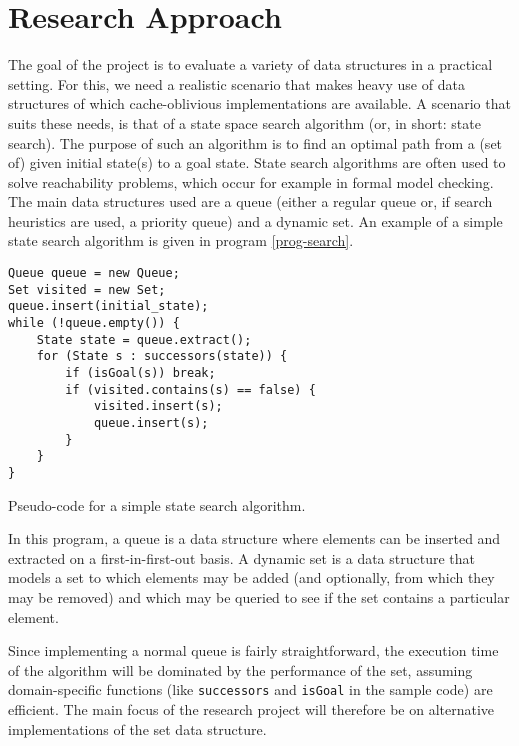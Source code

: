 \documentclass{acm_proc_article-sp}
\begin{document}
\section{Research Approach}


The goal of the project is to evaluate a variety of data structures in a practical setting. For this, we need a realistic scenario that makes heavy use of data structures of which cache-oblivious implementations are available. A scenario that suits these needs, is that of a state space search algorithm (or, in short: state search). The purpose of such an algorithm is to find an optimal path from a (set of) given initial state(s) to a goal state. State search algorithms are often used to solve reachability problems, which occur for example in formal model checking. The main data structures used are a queue (either a regular queue or, if search heuristics are used, a priority queue) and a dynamic set. An example of a simple state search algorithm is given in program \ref{prog-search}.

\begin{program}
\begin{verbatim}
Queue queue = new Queue;
Set visited = new Set;
queue.insert(initial_state);
while (!queue.empty()) {
    State state = queue.extract();
    for (State s : successors(state)) {
        if (isGoal(s)) break;
        if (visited.contains(s) == false) {
            visited.insert(s);
            queue.insert(s);
        }
    }
}
\end{verbatim}
\caption{Pseudo-code for a simple state search algorithm.}
\label{prog-search}
\end{program}

In this program, a queue is a data structure where elements can be inserted and extracted on a first-in-first-out basis. A dynamic set is a data structure that models a set to which elements may be added (and optionally, from which they may be removed) and which may be queried to see if the set contains a particular element.

Since implementing a normal queue is fairly straightforward, the execution time of the algorithm will be dominated by the performance of the set, assuming domain-specific functions (like \verb#successors# and \verb#isGoal# in the sample code) are efficient. The main focus of the research project will therefore be on alternative implementations of the set data structure.
\end{document}
